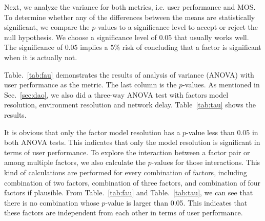 Next, we analyze the variance for both metrics, i.e. user performance and MOS.
To determine whether any of the differences between the means are  statistically significant, we compare the $p$-values to a significance level to accept or reject the null hypothesis. We choose a significance level of 0.05 that usually works well. The significance of 0.05 implies a $5\%$ risk of concluding that a factor is significant when it is actually not.

Table.~\ref{tab:fau} demonstrates the results of analysis of variance (ANOVA) with user performance as the metric.
The last column is the $p$-values.
As mentioned in Sec.~\ref{sec:dao}, we also did a three-way ANOVA test with factors model resolution, environment resolution and network delay. Table~\ref{tab:tau} shows the results.

It is obvious that only the factor model resolution has a $p$-value less than 0.05 in both ANOVA tests. This indicates that only the model resolution is significant in terms of user performance.
To explore the interaction between a factor pair or among multiple factors, we also calculate the $p$-values for those interactions.
This kind of calculations are performed for every combination of factors, including combination of two factors, combination of three factors, and combination of four factors if plausible.
From Table.~\ref{tab:fau} and Table.~\ref{tab:tau}, we can see that there is no combination whose $p$-value is larger than 0.05.
This indicates that these factors are independent from each other in terms of user performance.

